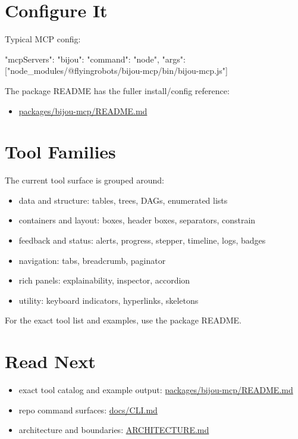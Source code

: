 \section{Configure It}\label{record-009-configure-it}

Typical MCP config:

\begin{CodeBlock}
{
  "mcpServers": {
    "bijou": {
      "command": "node",
      "args": ["node_modules/@flyingrobots/bijou-mcp/bin/bijou-mcp.js"]
    }
  }
}
\end{CodeBlock}

The package README has the fuller install/config reference:

\begin{itemize}
\tightlist
\item
  \href{https://github.com/flyingrobots/bijou/blob/cbd70612140e7a450d764b3c7be1c6af878b99bc/packages/bijou-mcp/README.md}{packages/bijou-mcp/README.md}
\end{itemize}

\section{Tool Families}\label{record-009-tool-families}

The current tool surface is grouped around:

\begin{itemize}
\tightlist
\item
  data and structure: tables, trees, DAGs, enumerated lists
\item
  containers and layout: boxes, header boxes, separators, constrain
\item
  feedback and status: alerts, progress, stepper, timeline, logs, badges
\item
  navigation: tabs, breadcrumb, paginator
\item
  rich panels: explainability, inspector, accordion
\item
  utility: keyboard indicators, hyperlinks, skeletons
\end{itemize}

For the exact tool list and examples, use the package README.

\section{Read Next}\label{record-009-read-next}

\begin{itemize}
\tightlist
\item
  exact tool catalog and example output: \href{https://github.com/flyingrobots/bijou/blob/cbd70612140e7a450d764b3c7be1c6af878b99bc/packages/bijou-mcp/README.md}{packages/bijou-mcp/README.md}
\item
  repo command surfaces: \href{https://github.com/flyingrobots/bijou/blob/cbd70612140e7a450d764b3c7be1c6af878b99bc/docs/CLI.md}{docs/CLI.md}
\item
  architecture and boundaries: \href{https://github.com/flyingrobots/bijou/blob/cbd70612140e7a450d764b3c7be1c6af878b99bc/ARCHITECTURE.md}{ARCHITECTURE.md}
\end{itemize}

